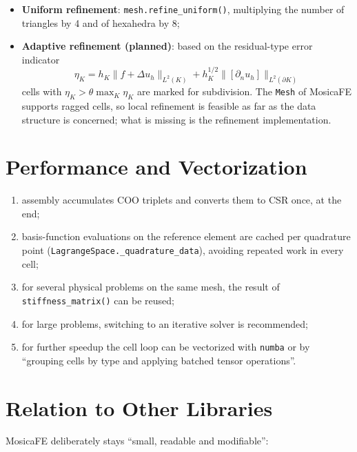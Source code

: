 \documentclass[11pt,oneside]{book}
\theoremstyle{definition}
\theoremstyle{plain}
\newcommand{\mosica}{\textsf{MosicaFE}}
\newcommand{\code}[1]{\texttt{#1}}
\begin{document}
\begin{itemize}[itemsep=0.2em]
  \item \textbf{Uniform refinement}: \code{mesh.refine\_\allowbreak uniform()}, multiplying the
        number of triangles by 4 and of hexahedra by 8;
  \item \textbf{Adaptive refinement (planned)}: based on the residual-type error
        indicator
        \begin{equation}
        \eta_K=h_K\|f+\Delta u_h\|_{L^2(K)}
        +h_K^{1/2}\|[\partial_n u_h]\|_{L^2(\partial K)}
        \label{eq:estimator}
        \end{equation}
        cells with $\eta_K>\theta\max_K\eta_K$ are marked for subdivision. The
        \code{Mesh} of \mosica{} supports ragged cells, so local refinement is
        feasible as far as the data structure is concerned; what is missing is the
        refinement implementation.
\end{itemize}

\section{Performance and Vectorization}

\begin{enumerate}[label=(\arabic*),itemsep=0.2em]
  \item assembly accumulates COO triplets and converts them to CSR once, at the end;
  \item basis-function evaluations on the reference element are cached per quadrature
        point (\code{LagrangeSpace.\_\allowbreak quadrature\_\allowbreak data}), avoiding repeated work in
        every cell;
  \item for several physical problems on the same mesh, the result of
        \code{stiffness\_\allowbreak matrix()} can be reused;
  \item for large problems, switching to an iterative solver is recommended;
  \item for further speedup the cell loop can be vectorized with \code{numba} or by
        ``grouping cells by type and applying batched tensor operations''.
\end{enumerate}

\section{Relation to Other Libraries}

\mosica{} deliberately stays ``small, readable and modifiable'':
\end{document}
